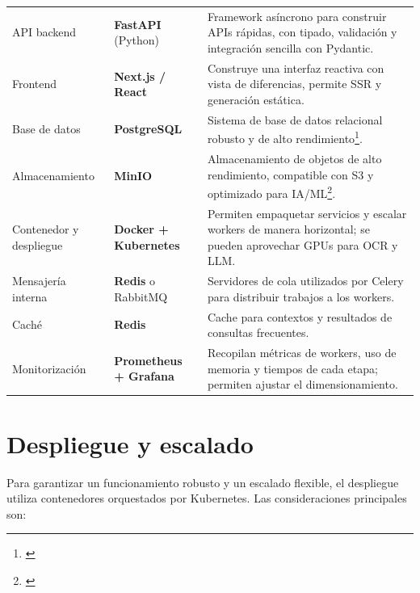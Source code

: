 \documentclass[12pt]{article}
\newcommand{\tcite}[1]{\footnote{\textnormal{\detokenize{#1}}}}
\begin{document}
\begin{longtable}{>{\raggedright\arraybackslash}p{3.5cm}p{3.5cm}p{6cm}}
  \addlinespace
  API backend & \textbf{FastAPI} (Python) & Framework asíncrono para construir APIs rápidas, con tipado, validación y
        integración sencilla con Pydantic. \\
  \addlinespace
  Frontend & \textbf{Next.js / React} & Construye una interfaz reactiva con vista de diferencias, permite SSR y generación estática. \\
  \addlinespace
  Base de datos & \textbf{PostgreSQL} & Sistema de base de datos relacional robusto y de alto rendimiento\tcite{【357047729773606†L23-L25】}. \\
  \addlinespace
  Almacenamiento & \textbf{MinIO} & Almacenamiento de objetos de alto rendimiento, compatible con S3 y optimizado para IA/ML\tcite{【870299264509201†L414-L421】}. \\
  \addlinespace
  Contenedor y despliegue & \textbf{Docker + Kubernetes} & Permiten empaquetar servicios y escalar workers de manera horizontal; se pueden aprovechar GPUs para OCR y LLM. \\
  \addlinespace
  Mensajería interna & \textbf{Redis} o RabbitMQ & Servidores de cola utilizados por Celery para distribuir trabajos a los workers. \\
  \addlinespace
  Caché & \textbf{Redis} & Cache para contextos y resultados de consultas frecuentes. \\
  \addlinespace
  Monitorización & \textbf{Prometheus + Grafana} & Recopilan métricas de workers, uso de memoria y tiempos de cada etapa; permiten ajustar el dimensionamiento. \\
\end{longtable}

\section{Despliegue y escalado}

Para garantizar un funcionamiento robusto y un escalado flexible, el despliegue utiliza contenedores
orquestados por Kubernetes.  Las consideraciones principales son:
\end{document}
